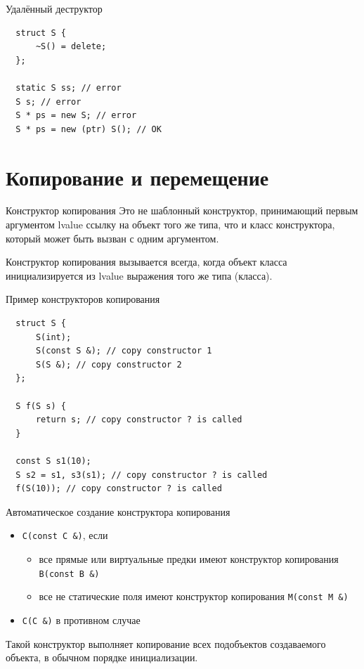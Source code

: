 \documentclass[unknownkeysallowed,xcolor=table]{beamer}
\begin{document}
\begin{frame}[fragile]{Удалённый деструктор}
  \begin{lstlisting}
  struct S {
      ~S() = delete;
  };

  static S ss; // error
  S s; // error
  S * ps = new S; // error
  S * ps = new (ptr) S(); // OK
  \end{lstlisting}
\end{frame}


\section{Копирование и перемещение}

\begin{frame}{Конструктор копирования}
  Это не шаблонный конструктор, принимающий первым аргументом lvalue ссылку на объект того же типа, что и класс конструктора, который может быть вызван с одним аргументом.

  \vspace{1em}

  Конструктор копирования вызывается всегда, когда объект класса инициализируется из lvalue выражения того же типа (класса).
\end{frame}

\begin{frame}[fragile]{Пример конструкторов копирования}
  \begin{lstlisting}
  struct S {
      S(int);
      S(const S &); // copy constructor 1
      S(S &); // copy constructor 2
  };

  S f(S s) {
      return s; // copy constructor ? is called
  }

  const S s1(10);
  S s2 = s1, s3(s1); // copy constructor ? is called
  f(S(10)); // copy constructor ? is called
  \end{lstlisting}
\end{frame}

\begin{frame}{Автоматическое создание конструктора копирования}
  \begin{itemize}
    \item \lstinline{C(const C &)}, если
      \begin{itemize}
        \item все прямые или виртуальные предки имеют конструктор копирования \lstinline{B(const B &)}
        \item все не статические поля имеют конструктор копирования \lstinline{M(const M &)}
      \end{itemize}
    \item \lstinline{C(C &)} в противном случае
  \end{itemize}

  \vspace{1em}

  Такой конструктор выполняет копирование всех подобъектов создаваемого объекта, в обычном порядке инициализации.
\end{frame}
\end{document}
